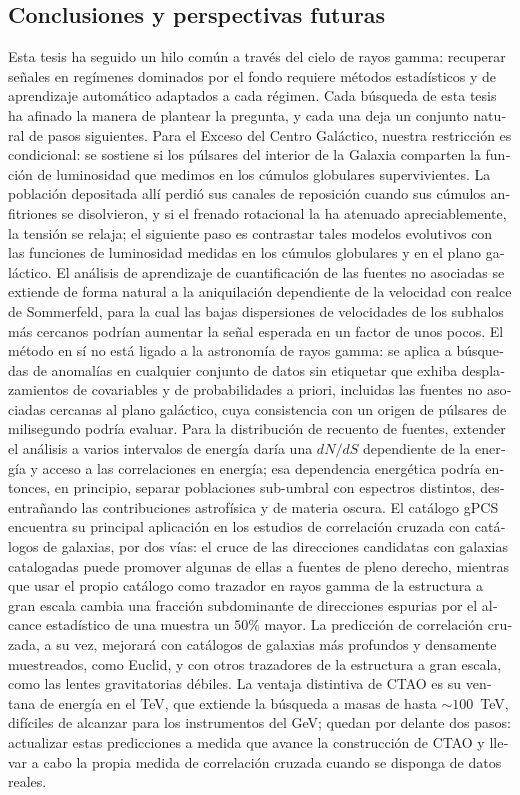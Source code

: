 \begin{otherlanguage}{spanish}
\section*{Conclusiones y perspectivas futuras}
Esta tesis ha seguido un hilo común a través del cielo de rayos gamma: recuperar señales en regímenes dominados por el fondo requiere métodos estadísticos y de aprendizaje automático adaptados a cada régimen.
Cada búsqueda de esta tesis ha afinado la manera de plantear la pregunta, y cada una deja un conjunto natural de pasos siguientes. Para el Exceso del Centro Galáctico, nuestra restricción es condicional: se sostiene si los púlsares del interior de la Galaxia comparten la función de luminosidad que medimos en los cúmulos globulares supervivientes. La población depositada allí perdió sus canales de reposición cuando sus cúmulos anfitriones se disolvieron, y si el frenado rotacional la ha atenuado apreciablemente, la tensión se relaja; el siguiente paso es contrastar tales modelos evolutivos con las funciones de luminosidad medidas en los cúmulos globulares y en el plano galáctico. El análisis de aprendizaje de cuantificación de las fuentes no asociadas se extiende de forma natural a la aniquilación dependiente de la velocidad con realce de Sommerfeld, para la cual las bajas dispersiones de velocidades de los subhalos más cercanos podrían aumentar la señal esperada en un factor de unos pocos. El método en sí no está ligado a la astronomía de rayos gamma: se aplica a búsquedas de anomalías en cualquier conjunto de datos sin etiquetar que exhiba desplazamientos de covariables y de probabilidades a priori, incluidas las fuentes no asociadas cercanas al plano galáctico, cuya consistencia con un origen de púlsares de milisegundo podría evaluar. Para la distribución de recuento de fuentes, extender el análisis a varios intervalos de energía daría una $dN/dS$ dependiente de la energía y acceso a las correlaciones en energía; esa dependencia energética podría entonces, en principio, separar poblaciones sub-umbral con espectros distintos, desentrañando las contribuciones astrofísica y de materia oscura. El catálogo gPCS encuentra su principal aplicación en los estudios de correlación cruzada con catálogos de galaxias, por dos vías: el cruce de las direcciones candidatas con galaxias catalogadas puede promover algunas de ellas a fuentes de pleno derecho, mientras que usar el propio catálogo como trazador en rayos gamma de la estructura a gran escala cambia una fracción subdominante de direcciones espurias por el alcance estadístico de una muestra un $50\%$ mayor. La predicción de correlación cruzada, a su vez, mejorará con catálogos de galaxias más profundos y densamente muestreados, como Euclid, y con otros trazadores de la estructura a gran escala, como las lentes gravitatorias débiles. La ventaja distintiva de CTAO es su ventana de energía en el TeV, que extiende la búsqueda a masas de hasta $\sim 100$~TeV, difíciles de alcanzar para los instrumentos del GeV; quedan por delante dos pasos: actualizar estas predicciones a medida que avance la construcción de CTAO y llevar a cabo la propia medida de correlación cruzada cuando se disponga de datos reales.


\end{otherlanguage}

